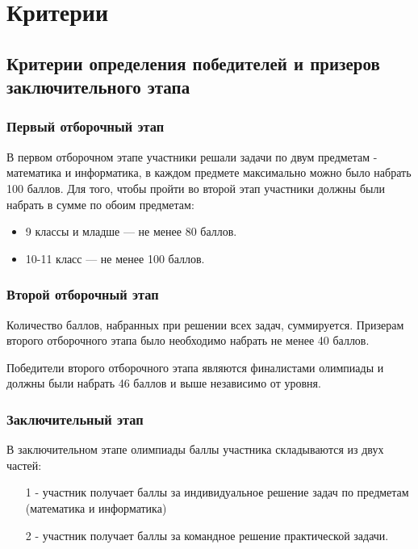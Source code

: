\part{Критерии}

\chapter{Критерии определения победителей и призеров заключительного этапа}
 
\section{Первый отборочный этап}
 
В первом отборочном этапе участники решали задачи по двум предметам - математика и информатика, в каждом предмете максимально можно было набрать 100 баллов. Для того, чтобы пройти во второй этап участники должны были набрать в сумме по обоим предметам:
\begin{itemize}
    \item 9 классы и младше — не менее 80 баллов.
    \item 10-11 класс — не менее 100 баллов.
\end{itemize}

\section{Второй отборочный этап}

Количество баллов, набранных при решении всех задач, суммируется. Призерам второго отборочного этапа было необходимо набрать не менее 40 баллов.

Победители второго отборочного этапа являются финалистами олимпиады и должны были набрать 46 баллов и выше независимо от уровня.

\section{Заключительный этап}

В заключительном этапе олимпиады баллы участника складываются из двух частей: 
\begin{enumerate}
    \item[1 -] участник получает баллы за индивидуальное решение задач по предметам (математика и информатика)
    \item[2 -] участник получает баллы за командное решение практической задачи.
\end{enumerate} 

